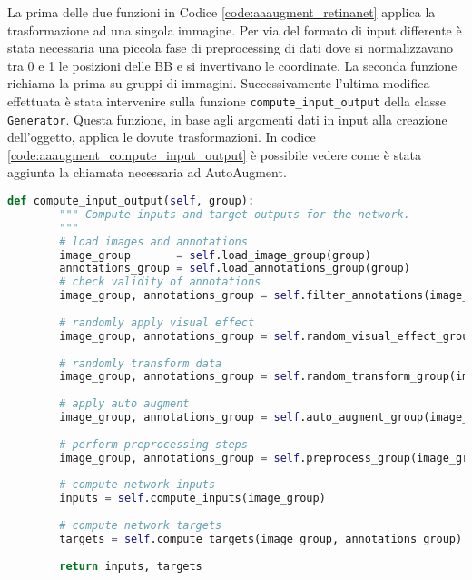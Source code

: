 La prima delle due funzioni in Codice \ref{code:aaaugment_retinanet} applica la trasformazione ad una singola immagine. Per via del formato di input differente è stata necessaria una piccola fase di preprocessing di dati dove si normalizzavano tra 0 e 1 le posizioni delle \ac{BB} e si invertivano le coordinate. La seconda funzione richiama la prima su gruppi di immagini. 
Successivamente l'ultima modifica effettuata è stata intervenire sulla funzione \texttt{compute\_input\_output} della classe \texttt{Generator}. Questa funzione, in base agli argomenti dati in input alla creazione dell'oggetto, applica le dovute trasformazioni. In codice \ref{code:aaaugment_compute_input_output} è possibile vedere come è stata aggiunta la chiamata necessaria ad AutoAugment. 


\begin{lstlisting}[caption={Funzione compute\_input\_output del generatore}, language=Python, basicstyle=\tiny,label=code:aaaugment_compute_input_output]
    def compute_input_output(self, group):
        """ Compute inputs and target outputs for the network.
        """
        # load images and annotations
        image_group       = self.load_image_group(group)
        annotations_group = self.load_annotations_group(group)
        # check validity of annotations
        image_group, annotations_group = self.filter_annotations(image_group, annotations_group, group)
    
        # randomly apply visual effect
        image_group, annotations_group = self.random_visual_effect_group(image_group, annotations_group)
    
        # randomly transform data
        image_group, annotations_group = self.random_transform_group(image_group, annotations_group)
        
        # apply auto augment
        image_group, annotations_group = self.auto_augment_group(image_group, annotations_group)
    
        # perform preprocessing steps
        image_group, annotations_group = self.preprocess_group(image_group, annotations_group)
    
        # compute network inputs
        inputs = self.compute_inputs(image_group)
    
        # compute network targets
        targets = self.compute_targets(image_group, annotations_group)
    
        return inputs, targets
\end{lstlisting}

